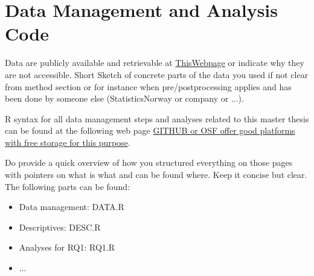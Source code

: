 \section{Data Management and Analysis Code}\label{app:B}

\appindent Data are publicly available and retrievable at \url{ThisWebpage} or indicate why they are not accessible. Short Sketch of concrete parts of the data you used if not clear from method section or for instance when pre/postprocessing applies and has been done by someone else (StatisticsNorway or company or ...).


R syntax for all data management steps and analyses related to this master thesis can be found at the following web page \url{GITHUB or OSF offer good platforms with free storage for this purpose}.

Do provide a quick overview of how you structured everything on those pages with pointers on what is what and can be found where. Keep it concise but  clear. The following parts can be found:
\begin{itemize}
    \item Data management: DATA.R
    \item Descriptives: DESC.R
    \item Analyses for RQ1: RQ1.R
    \item ...
\end{itemize}
